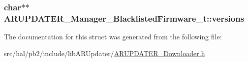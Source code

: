 \subsubsection[{\texorpdfstring{versions}{versions}}]{\setlength{\rightskip}{0pt plus 5cm}char$\ast$$\ast$ A\+R\+U\+P\+D\+A\+T\+E\+R\+\_\+\+Manager\+\_\+\+Blacklisted\+Firmware\+\_\+t\+::versions}\hypertarget{struct_a_r_u_p_d_a_t_e_r___manager___blacklisted_firmware__t_abed560cf241ce2b0926dbf41057e3b5a}{}\label{struct_a_r_u_p_d_a_t_e_r___manager___blacklisted_firmware__t_abed560cf241ce2b0926dbf41057e3b5a}


The documentation for this struct was generated from the following file\+:\begin{DoxyCompactItemize}
\item 
src/hal/pb2/include/lib\+A\+R\+Updater/\hyperlink{_a_r_u_p_d_a_t_e_r___downloader_8h}{A\+R\+U\+P\+D\+A\+T\+E\+R\+\_\+\+Downloader.\+h}\end{DoxyCompactItemize}
